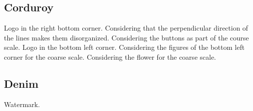 \clearpage
\renewcommand{\mat}{Corduroy}
\subsection{\mat}

\renewcommand{\Number}{01}\InputImage{\sexor}{\tsm}{\sexor}{\tsm}{\sexor}{\tbu}
{Logo in the right bottom corner.}{}
\renewcommand{\Number}{02}\InputImage{\sfl}{\tve}{\sexor}{\tbu}{\sexdi}{\tbu}
{}{Considering that the perpendicular direction of the lines makes them disorganized.}
\renewcommand{\Number}{03}\InputImage{\sfl}{\tsm}{\sexor}{\tbu}{\sexdi}{\tbu}
{}{}
\renewcommand{\Number}{04}\InputImage{\sfl}{\tsm}{\sexor}{\tbu}{\sexdi}{\tbu}
{}{}
\renewcommand{\Number}{05}\InputImage{\sfl}{\tve}{\sexor}{\tbu}{\sexdi}{\tbu}
{}{}
\renewcommand{\Number}{06}\InputImage{\sfl}{\tve}{\sexor}{\tbu}{\sro}{\tbu}
{}{Considering the buttons as part of the course scale.}
\renewcommand{\Number}{07}\InputImage{\sfl}{\tve}{\sexor}{\tbu}{\sexor}{\tbu}
{}{}
\renewcommand{\Number}{08}\InputImage{\sfl}{\tve}{\sexor}{\tbu}{\sexor}{\tbu}
{Logo in the bottom left corner.}{}
\renewcommand{\Number}{09}\InputImage{\sfl}{\tve}{\sexor}{\tbu}{\sexor}{\tbu}
{}{}
\renewcommand{\Number}{10}\InputImage{\sexor}{\tbu}{\sexor}{\tbu}{\sro}{\tbu}
{}{Considering the figures of the bottom left corner for the coarse scale.}
\renewcommand{\Number}{11}\InputImage{\sfl}{\tve}{\sexor}{\tbu}{\sexor}{\tbu}
{}{}
\renewcommand{\Number}{12}\InputImage{\sexor}{\tbu}{\sexor}{\tbu}{\sro}{\tbu}
{}{Considering the flower for the coarse scale.}

\clearpage
\renewcommand{\mat}{Denim}
\subsection{\mat}

\renewcommand{\Number}{01}\InputImage{\sexor}{\tsm}{\sexor}{\tsm}{\sexor}{\tsm}
{}{}
\renewcommand{\Number}{02}\InputImage{\sexor}{\tsm}{\sexor}{\tsm}{\sexor}{\tsm}
{}{}
\renewcommand{\Number}{03}\InputImage{\sexor}{\tsm}{\sexor}{\tsm}{\sexdi}{\tbu}
{}{}
\renewcommand{\Number}{04}\InputImage{\sexor}{\tsm}{\sexor}{\tsm}{\sexdi}{\tbu}
{}{}
\renewcommand{\Number}{05}\InputImage{\sexor}{\tsm}{\sexor}{\tsm}{\sexor}{\tsm}
{}{}
\renewcommand{\Number}{06}\InputImage{\sro}{\tsm}{\sro}{\tsm}{\sro}{\tsm}
{}{}
\renewcommand{\Number}{07}\InputImage{\sexor}{\tsm}{\sexor}{\tsm}{\sexdi}{\tsm}
{}{}
\renewcommand{\Number}{08}\InputImage{\sexor}{\tsm}{\sexor}{\tsm}{\sexor}{\tsm}
{Watermark.}{}
\renewcommand{\Number}{09}\InputImage{\sro}{\tsm}{\sro}{\tsm}{\sro}{\tsm}
{}{}
\renewcommand{\Number}{10}\InputImage{\sexor}{\tsm}{\sexor}{\tsm}{\sexdi}{\tbu}
{}{}
\renewcommand{\Number}{11}\InputImage{\sro}{\tsm}{\sro}{\tsm}{\sro}{\tbu}
{}{}
\renewcommand{\Number}{12}\InputImage{\sro}{\tsm}{\sro}{\tsm}{\sro}{\tbu}
{}{}


